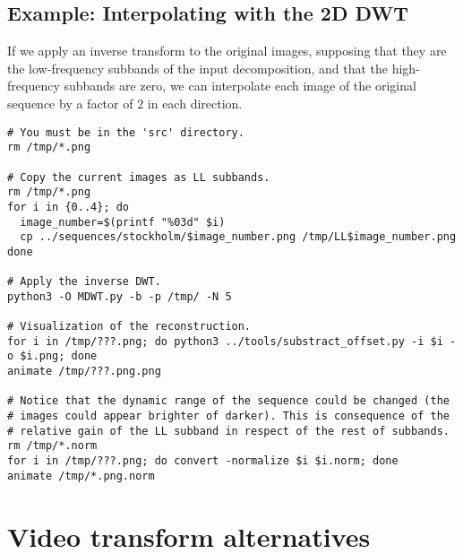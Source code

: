 
\subsection*{Example: Interpolating with the 2D DWT}
If we apply an inverse transform to the original images, supposing
that they are the low-frequency subbands of the input decomposition,
and that the high-frequency subbands are zero, we can interpolate each
image of the original sequence by a factor of $2$ in each direction.

\begin{verbatim}
# You must be in the 'src' directory.
rm /tmp/*.png

# Copy the current images as LL subbands.
rm /tmp/*.png
for i in {0..4}; do
  image_number=$(printf "%03d" $i)
  cp ../sequences/stockholm/$image_number.png /tmp/LL$image_number.png
done

# Apply the inverse DWT.
python3 -O MDWT.py -b -p /tmp/ -N 5

# Visualization of the reconstruction.
for i in /tmp/???.png; do python3 ../tools/substract_offset.py -i $i -o $i.png; done
animate /tmp/???.png.png

# Notice that the dynamic range of the sequence could be changed (the
# images could appear brighter of darker). This is consequence of the
# relative gain of the LL subband in respect of the rest of subbands.
rm /tmp/*.norm
for i in /tmp/???.png; do convert -normalize $i $i.norm; done
animate /tmp/*.png.norm
\end{verbatim}

\section{Video transform alternatives}

